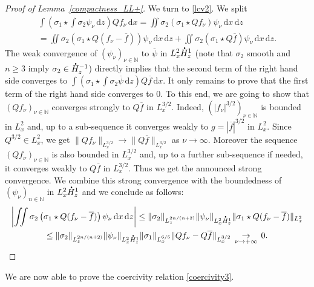 \documentclass[10pt]{amsart}
\let\bar\oldbar
\theoremstyle{definition}
\newcommand*{\overbigdot}[1]{%
\accentset{\mbox{\large\bfseries .}}{#1}}
\let\bar\overline
\newenvironment{ProofOf}[1]{\begin{proof}[Proof of #1]}{\end{proof}}
\newcommand{\ud}{\, {\mathrm{d}}}
\begin{document}
\begin{ProofOf}{Lemma~\ref{compactness_LL+}}
We turn to \eqref{lcv2}. We split
\begin{multline*}
\int\left(\sigma_{1}\star\int\sigma_{2}\psi_{\nu}\ud z\right)Qf_{\nu}\ud x=\iint\sigma_{2}\left(\sigma_{1}\star Qf_{\nu}\right)\psi_{\nu}\ud x\ud z\\
=\iint\sigma_{2}\left(\sigma_{1}\star Q(f_{\nu}-\bar{f})\right)\psi_{\nu}\ud x\ud z+\iint\sigma_{2}\left(\sigma_{1}\star Q\bar{f}\right)\psi_{\nu}\ud x\ud z.
\end{multline*}
The weak convergence of $(\psi_{\nu})_{\nu\in\mathbb N}$ to $\bar{\psi}$ in $L_{x}^{2}\overbigdot{H}_{z}^{1}$ (note that $\sigma_{2}$ smooth and $n\geq 3$ imply $\sigma_{2}\in\overbigdot{H}_{z}^{-1}$) directly implies that
the second term of the right hand side converges to $\int(\sigma_{1}\star\int\sigma_{2}\bar{\psi}\ud z)Q\bar{f}\ud x$.
It only remains to prove that the first term of the right hand side converges to $0$.
To this end, we are going to show
that $(Qf_{\nu})_{\nu\in\mathbb N}$ converges strongly to $Q\bar{f}$ in $L_{x}^{3/2}$. Indeed, $(|f_{\nu}|^{3/2})_{\nu\in\mathbb N}$ is bounded in $L_{x}^{2}$ and, up to a sub-sequence it converges weakly to $g=|\bar{f}|^{3/2}$ in $L_{x}^{2}$. Since $Q^{3/2}\in L_{x}^{2}$, we get $\|Qf_{\nu}\|_{L_{x}^{3/2}}\to\|Q\bar{f}\|_{L_{x}^{3/2}}$ as $\nu\to \infty$. Moreover the sequence $(Qf_{\nu})_{\nu\in\mathbb N}$ is also bounded in $L_{x}^{3/2}$ and, up to a further sub-sequence if needed, it converges weakly to $Q\bar{f}$ in $L_{x}^{3/2}$. Thus we get the announced strong convergence. We combine this strong convergence with the boundedness of $(\psi_{\nu})_{n\in \mathbb N}$ in $L_{x}^{2}\overbigdot{H}_{z}^{1}$ and we conclude as follows:
\bgroup
{}
\begin{multline*}
\left|\iint\sigma_{2}\left(\sigma_{1}\star Q(f_{\nu}-\bar{f})\right)\psi_{\nu}\ud x\ud z\right|\leq\|\sigma_{2}\|_{L_{z}^{2n/(n+2)}}\|\psi_{\nu}\|_{L_{x}^{2}\overbigdot{H}_{z}^{1}}\|\sigma_{1}\star Q(f_{\nu}-\bar{f})\|_{L_{x}^{2}}\\
\leq\|\sigma_{2}\|_{L_{z}^{2n/(n+2)}}\|\psi_{\nu}\|_{L_{x}^{2}\overbigdot{H}_{z}^{1}}\|\sigma_{1}\|_{L_{x}^{6/5}}\|Qf_{\nu}-Q\bar{f}\|_{L_{x}^{3/2}}\,\underset{\nu\to+\infty}{\to}\,0.\qedhere
\end{multline*}\egroup
\end{ProofOf}

We are now able to prove the coercivity relation \eqref{coercivity3}.
\end{document}
